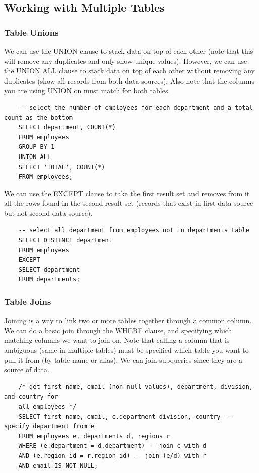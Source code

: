 \documentclass[11pt, a4paper]{article}
\begin{document}
\begin{spacing}{1.1}
	\subsection{Working with Multiple Tables} 
	\subsubsection{Table Unions}
	We can use the UNION clause to stack data on top of each other (note that this will remove any duplicates and only show unique values). However, we can use the UNION ALL clause to stack data on top of each other without removing any duplicates (show all records from both data sources). Also note that the columns you are using UNION on must match for both tables. 
	\begin{lstlisting}
	-- select the number of employees for each department and a total count as the bottom
	SELECT department, COUNT(*)
	FROM employees
	GROUP BY 1
	UNION ALL
	SELECT 'TOTAL', COUNT(*)
	FROM employees;	\end{lstlisting} \vspace*{1mm}
	We can use the EXCEPT clause to take the first result set and removes from it all the rows found in the second result set (records that exist in first data source but not second data source). 
	\begin{lstlisting}
	-- select all department from employees not in departments table
	SELECT DISTINCT department
	FROM employees
	EXCEPT
	SELECT department
	FROM departments; \end{lstlisting} \vspace*{1mm}
	\subsubsection{Table Joins}
	Joining is a way to link two or more tables together through a common column. We can do a basic join through the WHERE clause, and specifying which matching columns we want to join on. Note that calling a column that is ambiguous (same in multiple tables) must be specified which table you want to pull it from (by table name or alias). We can join subqueries since they are a source of data.
	\begin{lstlisting}
	/* get first name, email (non-null values), department, division, and country for 
	all employees */
	SELECT first_name, email, e.department division, country -- specify department from e
	FROM employees e, departments d, regions r
	WHERE (e.department = d.department) -- join e with d
	AND (e.region_id = r.region_id) -- join (e/d) with r
	AND email IS NOT NULL; 
	

\end{lstlisting}
\end{spacing}
\end{document}
